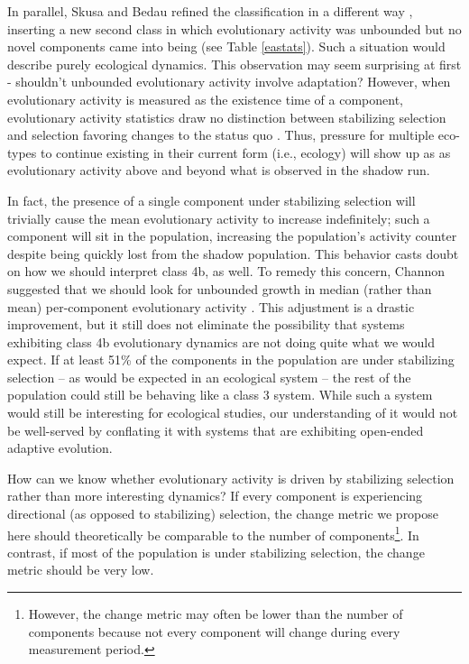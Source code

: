 \documentclass[letterpaper]{article}
\begin{document}
In parallel, Skusa and Bedau refined the classification in a different way \citep{skusa_towards_2003}, inserting a new second class in which evolutionary activity was unbounded but no novel components came into being (see Table \ref{eastats}). Such a situation would describe purely ecological dynamics. This observation may seem surprising at first - shouldn't unbounded evolutionary activity involve adaptation? However, when evolutionary activity is measured as the existence time of a component, evolutionary activity statistics draw no distinction between stabilizing selection and selection favoring changes to the status quo \citep{channon_improving_2003}. Thus, pressure for multiple eco-types to continue existing in their current form (i.e., ecology) will show up as as evolutionary activity above and beyond what is observed in the shadow run.  

In fact, the presence of a single component under stabilizing selection will trivially cause the mean evolutionary activity to increase indefinitely; such a component will sit in the population, increasing the population's activity counter despite being quickly lost from the shadow population. This behavior casts doubt on how we should interpret class 4b, as well. To remedy this concern, Channon suggested that we should look for unbounded growth in median (rather than mean) per-component evolutionary activity \citep{channon_improving_2003}. This adjustment is a drastic improvement, but it still does not eliminate the possibility that systems exhibiting class 4b evolutionary dynamics are not doing quite what we would expect. If at least 51\% of the components in the population are under stabilizing selection -- as would be expected in an ecological system -- the rest of the population could still be behaving like a class 3 system. While such a system would still be interesting for ecological studies, our understanding of it would not be well-served by conflating it with systems that are exhibiting open-ended adaptive evolution.


How can we know whether evolutionary activity is driven by stabilizing selection rather than more interesting dynamics? If every component is experiencing directional (as opposed to stabilizing) selection, the change metric we propose here should theoretically be comparable to the number of components\footnote{However, the change metric may often be lower than the number of components because not every component will change during every measurement period.}. In contrast, if most of the population is under stabilizing selection, the change metric should be very low.
\end{document}
